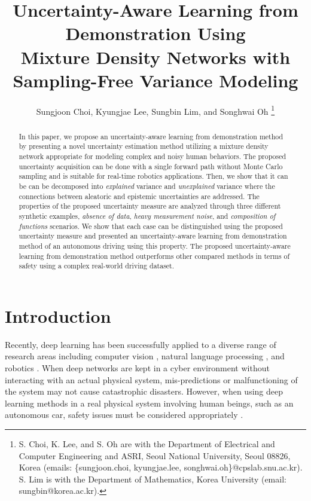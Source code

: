\documentclass[letterpaper, 10 pt, conference]{ieeeconf}  %
\title{
\bf
Uncertainty-Aware Learning from Demonstration Using \\
Mixture Density Networks with Sampling-Free Variance Modeling
}
\author{Sungjoon Choi, Kyungjae Lee, Sungbin Lim, and Songhwai Oh
\thanks{
S. Choi, K. Lee, and S. Oh are with the Department of
Electrical and Computer Engineering and ASRI, 
Seoul National University, Seoul 08826, Korea
(emails: \{sungjoon.choi, kyungjae.lee,
songhwai.oh\}@cpslab.snu.ac.kr).
S. Lim is with the Department of Mathematics,
Korea University (email: sungbin@korea.ac.kr).
}%
}
\begin{document}
\maketitle %


\begin{abstract}
In this paper, we propose an uncertainty-aware
learning from demonstration method by presenting
a novel uncertainty estimation method utilizing
a mixture density network appropriate for
modeling complex and noisy human behaviors.
The proposed uncertainty acquisition can be
done with a single forward path without Monte Carlo sampling
and is suitable for real-time robotics applications.
Then, we show that it can be can be decomposed into 
\textit{explained} variance and \textit{unexplained} variance
where the connections between aleatoric and epistemic
uncertainties are addressed.
The properties of the proposed uncertainty measure are
analyzed through three different synthetic examples, 
\textit{absence of data}, \textit{heavy measurement noise}, 
and \textit{composition of functions} scenarios.
We show that each case can be distinguished using 
the proposed uncertainty measure and 
presented 
an uncertainty-aware learning from demonstration method
of an autonomous driving
using this property. 
The proposed uncertainty-aware learning from demonstration
method outperforms other compared methods in terms of
safety using a complex real-world driving dataset.
\end{abstract}
\IEEEpeerreviewmaketitle


\section{Introduction}


Recently, deep learning has been successfully applied
to a diverse range of research areas 
including computer vision \cite{He_16},
natural language processing \cite{Collobert_08}, 
and robotics \cite{Schulman_15}.
When deep networks are kept in a cyber environment
without interacting with an actual physical system,
mis-predictions or malfunctioning of the system
may not cause catastrophic disasters.
However, when using deep learning methods 
in a real physical system involving human beings, 
such as an autonomous car,
safety issues must be considered appropriately \cite{Amodei_16}. 
\end{document}
